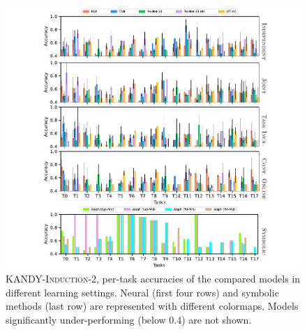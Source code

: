 \begin{figure}[!ht]

	\centering
	\includegraphics[width=1.0\textwidth]{imgs/kandy/Fig10.pdf}
	\caption[Per-task accuracies over time on \textsc{KANDY-Induction-2}]{\textsc{KANDY-Induction-2}, per-task accuracies of the compared models in different learning settings. Neural (first four rows) and symbolic methods (last row) are represented with different colormaps. Models significantly under-performing (below 0.4) are not shown.}
	\label{kandy:fig:acc_per_task_hard}
\end{figure}

